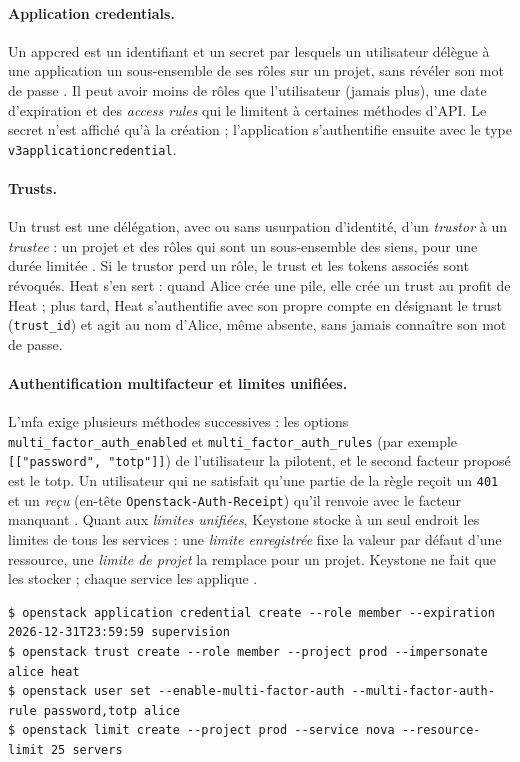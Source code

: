 \paragraph{Application credentials.} Un \gls{appcred} est un identifiant et un secret par lesquels un utilisateur délègue à une
application un sous-ensemble de ses rôles sur un projet, sans révéler son mot de passe \parencite{keystone-appcred}. Il peut avoir
moins de rôles que l'utilisateur (jamais plus), une date d'expiration et des \emph{access rules} qui le limitent à certaines méthodes
d'API. Le secret n'est affiché qu'à la création ; l'application s'authentifie ensuite avec le type \texttt{v3applicationcredential}.

\paragraph{Trusts.} Un \gls{trust} est une délégation, avec ou sans usurpation d'identité, d'un \emph{trustor} à un \emph{trustee} : un
projet et des rôles qui sont un sous-ensemble des siens, pour une durée limitée \parencite{keystone-trusts}. Si le trustor perd un rôle,
le trust et les tokens associés sont révoqués. Heat s'en sert : quand Alice crée une pile, elle crée un trust au profit de Heat ; plus
tard, Heat s'authentifie avec son propre compte en désignant le trust (\texttt{trust\_id}) et agit au nom d'Alice, même absente, sans
jamais connaître son mot de passe.

\paragraph{Authentification multifacteur et limites unifiées.} L'\gls{mfa} exige plusieurs méthodes successives : les options
\texttt{multi\_factor\_auth\_enabled} et \texttt{multi\_factor\_auth\_rules} (par exemple \texttt{[["password", "totp"]]}) de l'utilisateur
la pilotent, et le second facteur proposé est le \gls{totp}. Un utilisateur qui ne satisfait qu'une partie de la règle reçoit un
\texttt{401} et un \emph{reçu} (en-tête \texttt{Openstack-Auth-Receipt}) qu'il renvoie avec le facteur manquant \parencite{keystone-mfa}.
Quant aux \emph{limites unifiées}, Keystone stocke à un seul endroit les limites de tous les services : une \emph{limite enregistrée} fixe
la valeur par défaut d'une ressource, une \emph{limite de projet} la remplace pour un projet. Keystone ne fait que les stocker ; chaque
service les applique \parencite{keystone-limits}.

\par\noindent\begin{minipage}{\linewidth}
\begin{lstlisting}[style=terminal]
$ openstack application credential create --role member --expiration 2026-12-31T23:59:59 supervision
$ openstack trust create --role member --project prod --impersonate alice heat
$ openstack user set --enable-multi-factor-auth --multi-factor-auth-rule password,totp alice
$ openstack limit create --project prod --service nova --resource-limit 25 servers
\end{lstlisting}
\end{minipage}\par

